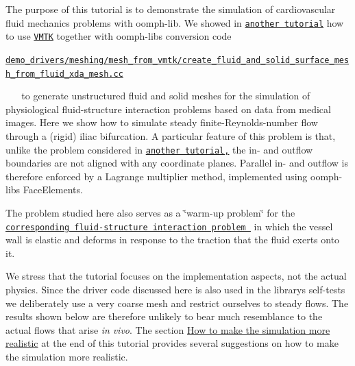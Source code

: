 The purpose of this tutorial is to demonstrate the simulation of cardiovascular fluid mechanics problems with {\ttfamily oomph-\/lib}. We showed in \href{../../../meshes/mesh_from_vmtk/html/index.html}{\tt another tutorial} how to use \href{http://www.vmtk.org}{\tt V\+M\+TK} together with {\ttfamily oomph-\/lib\textquotesingle{}s} conversion code ~\newline
~\newline
\begin{center} \href{../../../../demo_drivers/meshing/mesh_from_vmtk/create_fluid_and_solid_surface_mesh_from_fluid_xda_mesh.cc}{\tt demo\+\_\+drivers/meshing/mesh\+\_\+from\+\_\+vmtk/create\+\_\+fluid\+\_\+and\+\_\+solid\+\_\+surface\+\_\+mesh\+\_\+from\+\_\+fluid\+\_\+xda\+\_\+mesh.\+cc} \end{center}  ~\newline
~\newline
to generate unstructured fluid and solid meshes for the simulation of physiological fluid-\/structure interaction problems based on data from medical images. Here we show how to simulate steady finite-\/\+Reynolds-\/number flow through a (rigid) iliac bifurcation. A particular feature of this problem is that, unlike the problem considered in \href{../../unstructured_three_d_fluid/html/index.html}{\tt another tutorial,} the in-\/ and outflow boundaries are not aligned with any coordinate planes. Parallel in-\/ and outflow is therefore enforced by a Lagrange multiplier method, implemented using {\ttfamily oomph-\/lib\textquotesingle{}s} {\ttfamily Face\+Elements}.

The problem studied here also serves as a \char`\"{}warm-\/up problem\char`\"{} for the \href{../../../interaction/vmtk_fsi/html/index.html}{\tt corresponding fluid-\/structure interaction problem } in which the vessel wall is elastic and deforms in response to the traction that the fluid exerts onto it.

We stress that the tutorial focuses on the implementation aspects, not the actual physics. Since the driver code discussed here is also used in the library\textquotesingle{}s self-\/tests we deliberately use a very coarse mesh and restrict ourselves to steady flows. The results shown below are therefore unlikely to bear much resemblance to the actual flows that arise {\itshape in} {\itshape vivo}. The section \hyperlink{index_realism}{How to make the simulation more realistic} at the end of this tutorial provides several suggestions on how to make the simulation more realistic.




